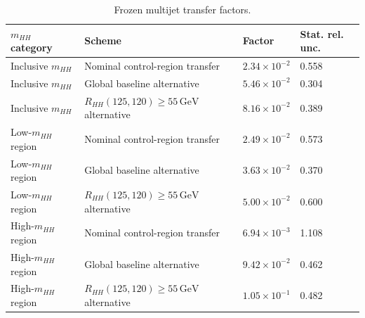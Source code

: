 \begin{table}[tb]
  \centering
  \footnotesize
  \caption{Frozen multijet transfer factors.}
  \label{tab:transfer-factors}
  \begin{tabular}{llll}
    \toprule
    $m_{HH}$ category & Scheme & Factor & Stat. rel. unc. \\
    \midrule
    Inclusive $m_{HH}$ & Nominal control-region transfer & $2.34\times10^{-2}$ & 0.558 \\
    Inclusive $m_{HH}$ & Global baseline alternative & $5.46\times10^{-2}$ & 0.304 \\
    Inclusive $m_{HH}$ & $R_{HH}(125,120)\geq55\,\mathrm{GeV}$ alternative & $8.16\times10^{-2}$ & 0.389 \\
    Low-$m_{HH}$ region & Nominal control-region transfer & $2.49\times10^{-2}$ & 0.573 \\
    Low-$m_{HH}$ region & Global baseline alternative & $3.63\times10^{-2}$ & 0.370 \\
    Low-$m_{HH}$ region & $R_{HH}(125,120)\geq55\,\mathrm{GeV}$ alternative & $5.00\times10^{-2}$ & 0.600 \\
    High-$m_{HH}$ region & Nominal control-region transfer & $6.94\times10^{-3}$ & 1.108 \\
    High-$m_{HH}$ region & Global baseline alternative & $9.42\times10^{-2}$ & 0.462 \\
    High-$m_{HH}$ region & $R_{HH}(125,120)\geq55\,\mathrm{GeV}$ alternative & $1.05\times10^{-1}$ & 0.482 \\
    \bottomrule
  \end{tabular}
\end{table}
